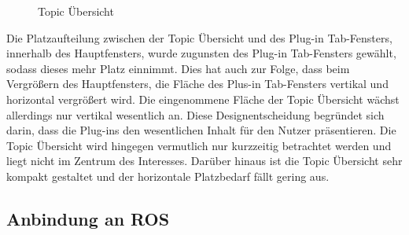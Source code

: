\begin{figure}[t]
  \begin{center}
  \end{center}
  \caption{Topic Übersicht}
  \label{fig:topics}
\end{figure}

Die Platzaufteilung zwischen der Topic Übersicht und des Plug-in Tab-Fensters,
innerhalb des Hauptfensters, wurde zugunsten des Plug-in Tab-Fensters gewählt,
sodass dieses mehr Platz einnimmt.  Dies hat auch zur Folge, dass beim Vergrößern
des Hauptfensters, die Fläche des Plus-in Tab-Fensters vertikal und horizontal
vergrößert wird. Die eingenommene Fläche der Topic Übersicht wächst allerdings
nur vertikal wesentlich an. Diese Designentscheidung begründet sich darin,
dass die Plug-ins den wesentlichen Inhalt für den Nutzer präsentieren. Die
Topic Übersicht wird hingegen vermutlich nur kurzzeitig betrachtet werden und
liegt nicht im Zentrum des Interesses. Darüber hinaus ist die Topic Übersicht
sehr kompakt gestaltet und der horizontale Platzbedarf fällt gering aus.


\subsection{Anbindung an ROS}

